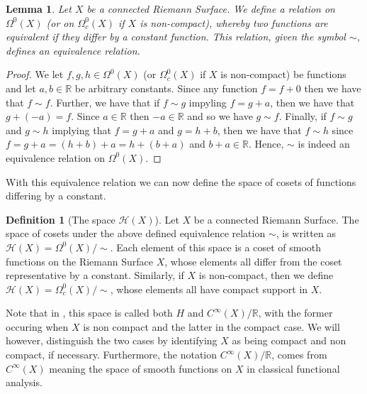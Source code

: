 \documentclass[11pt]{report}
\newtheorem{lemma}[thm]{Lemma}
\theoremstyle{definition}
\newtheorem{defn}[thm]{Definition}
\begin{document}


\begin{lemma}
  Let $X$ be a connected Riemann Surface. We define a relation on $\Omega^0(X)$ (or on $\Omega^0_c(X)$ if $X$ is non-compact), whereby two functions are equivalent if they differ by a constant function. This relation, given the symbol $\sim$, defines an equivalence relation.
\end{lemma}

\begin{proof}
  We let $f,g,h \in \Omega^0(X)$ (or $\Omega^0_c(X)$ if $X$ is non-compact) be functions and let $a, b \in \mathbb{R}$ be arbitrary constants. 
  Since any function $f = f + 0$ then we have that $f \sim f$. 
  Further, we have that if $f \sim g$ impyling $f = g + a$, then we have that $g + (-a) = f$. Since $a \in \mathbb{R}$ then $-a \in \mathbb{R}$ and so we have $g \sim f$. 
  Finally, if $f \sim g$ and $g \sim h$ implying that $f = g + a$ and $g = h + b$, then we have that $f \sim h$ since $f = g + a = (h + b) + a = h + (b + a)$ and $b+a \in \mathbb{R}$. Hence, $\sim$ is indeed an equivalence relation on $\Omega^0(X)$. 
\end{proof}

With this equivalence relation we can now define the space of cosets of functions differing by a constant.

\begin{defn}[The space $\mathcal{H}(X)$]
  Let $X$ be a connected Riemann Surface. The space of cosets under the above defined equivalence relation $\sim$, is written as $\mathcal{H}(X) = \Omega^0(X)/\sim$. Each element of this space is a coset of smooth functions on the Riemann Surface $X$, whose elements all differ from the coset representative by a constant. 
  Similarly, if $X$ is non-compact, then we define $\mathcal{H}(X) = \Omega^0_c(X)/\sim$, whose elements all have compact support in $X$.
\end{defn}

Note that in \cite{donaldson}, this space is called both $H$ and $C^{\infty}(X)/\mathbb{R}$, with the former occuring when $X$ is non compact and the latter in the compact case. We will however, distinguish the two cases by identifying $X$ as being compact and non compact, if necessary. Furthermore, the notation $C^{\infty}(X)/\mathbb{R}$, comes from $C^{\infty}(X)$ meaning the space of smooth functions on $X$ in classical functional analysis. 
\end{document}
